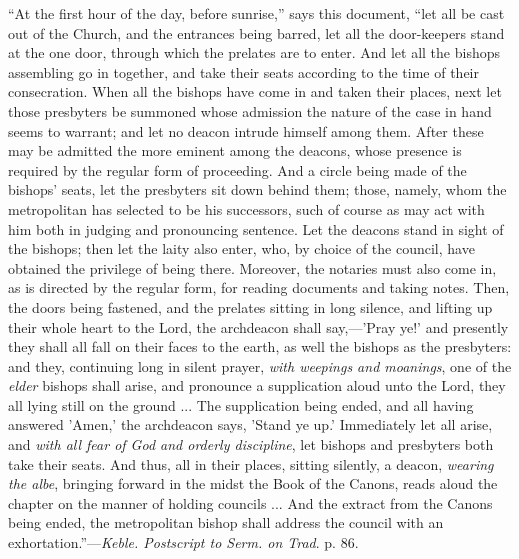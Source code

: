``At
the first hour of the day, before sunrise,'' says this document, ``let
all be cast out of the Church, and the entrances being barred, let all
the door-keepers stand at the one door, through which the prelates are
to enter. And let all the bishops assembling go in together, and take
their seats according to the time of their consecration. When all the
bishops have come in and taken their places,
next let those presbyters be summoned whose admission the nature of the
case in hand seems to warrant; and let no deacon intrude himself among
them. After these may be admitted the more eminent among the deacons,
whose presence is required by the regular form of proceeding. And a
circle being made of the bishops' seats, let the presbyters sit down
behind them; those, namely, whom the metropolitan has selected to be his
successors, such of course as may act with him both in judging and
pronouncing sentence. Let the deacons stand in sight of the bishops;
then let the laity also enter, who, by choice of the council, have
obtained the privilege of being there. Moreover, the notaries must also
come in, as is directed by the regular form, for reading documents and
taking notes. Then, the doors being fastened, and the prelates sitting
in long silence, and lifting up their whole heart to the Lord, the
archdeacon shall say,—'Pray ye!' and presently they shall all fall
on their faces to the earth, as well the bishops as the presbyters: and
they, continuing long in silent prayer, \emph{with weepings and moanings},
one of the \emph{elder} bishops shall arise, and pronounce a
supplication aloud unto the Lord, they all lying still on the ground ...
The supplication being ended, and all having answered 'Amen,' the
archdeacon says, 'Stand ye up.' Immediately let all arise, and \emph{with
all fear of God and orderly discipline}, let bishops and presbyters
both take their seats. And thus, all in their places, sitting silently,
a deacon, \emph{wearing the albe}, bringing forward in the midst the
Book of the Canons, reads aloud the chapter on the manner of holding
councils ... And the extract from the Canons being ended, the
metropolitan bishop shall address the council with an exhortation.''—\emph{Keble.
Postscript to Serm. on Trad}. p. 86.

